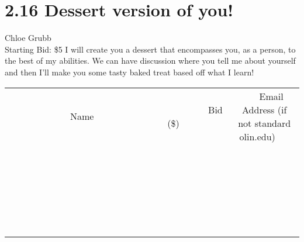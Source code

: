\documentclass[11pt]{article}
\begin{document}
\section*{2.16 Dessert version of you!}
Chloe Grubb
\\
Starting Bid: \$5
\newline
I will create you a dessert that encompasses you, as a person, to the best of my abilities. We can have  discussion where you tell me about yourself and then I'll make you some tasty baked treat based off what I learn!
\\[6ex]
\begin{tabular}{c c c}
~~~~~~~~~~~~~Name~~~~~~~~~~~~~ & ~~~~~~~~~Bid (\$)~~~~~~~~~  & ~~~Email Address (if not standard olin.edu)~~~\\
 & & \\
\hline
 & & \\
\hline
 & & \\
\hline
 & & \\
\hline
 & & \\
\hline
 & & \\
\hline
 & & \\
\hline
 & & \\
\hline
 & & \\
\hline
 & & \\
\hline
 & & \\
\hline
 & & \\
\hline
 & & \\
\hline
 & & \\
\hline
 & & \\
\hline
 & & \\
\hline
 & & \\
\hline
 & & \\
\hline
 & & \\
\hline
 & & \\
\hline
 & & \\
\hline
 & & \\
\hline
 & & \\
\hline
 & & \\
\hline
 & & \\
\hline
 & & \\
\hline
\end{tabular}
\newpage
\end{document}
